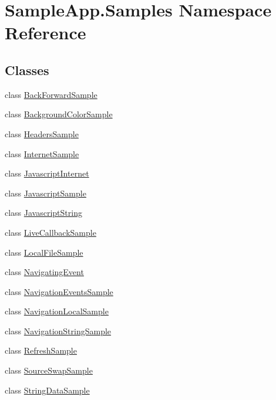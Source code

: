 \hypertarget{namespace_sample_app_1_1_samples}{}\section{Sample\+App.\+Samples Namespace Reference}
\label{namespace_sample_app_1_1_samples}
\subsection*{Classes}
\begin{DoxyCompactItemize}
\item 
class \hyperlink{class_sample_app_1_1_samples_1_1_back_forward_sample}{Back\+Forward\+Sample}
\item 
class \hyperlink{class_sample_app_1_1_samples_1_1_background_color_sample}{Background\+Color\+Sample}
\item 
class \hyperlink{class_sample_app_1_1_samples_1_1_headers_sample}{Headers\+Sample}
\item 
class \hyperlink{class_sample_app_1_1_samples_1_1_internet_sample}{Internet\+Sample}
\item 
class \hyperlink{class_sample_app_1_1_samples_1_1_javascript_internet}{Javascript\+Internet}
\item 
class \hyperlink{class_sample_app_1_1_samples_1_1_javascript_sample}{Javascript\+Sample}
\item 
class \hyperlink{class_sample_app_1_1_samples_1_1_javascript_string}{Javascript\+String}
\item 
class \hyperlink{class_sample_app_1_1_samples_1_1_live_callback_sample}{Live\+Callback\+Sample}
\item 
class \hyperlink{class_sample_app_1_1_samples_1_1_local_file_sample}{Local\+File\+Sample}
\item 
class \hyperlink{class_sample_app_1_1_samples_1_1_navigating_event}{Navigating\+Event}
\item 
class \hyperlink{class_sample_app_1_1_samples_1_1_navigation_events_sample}{Navigation\+Events\+Sample}
\item 
class \hyperlink{class_sample_app_1_1_samples_1_1_navigation_local_sample}{Navigation\+Local\+Sample}
\item 
class \hyperlink{class_sample_app_1_1_samples_1_1_navigation_string_sample}{Navigation\+String\+Sample}
\item 
class \hyperlink{class_sample_app_1_1_samples_1_1_refresh_sample}{Refresh\+Sample}
\item 
class \hyperlink{class_sample_app_1_1_samples_1_1_source_swap_sample}{Source\+Swap\+Sample}
\item 
class \hyperlink{class_sample_app_1_1_samples_1_1_string_data_sample}{String\+Data\+Sample}
\end{DoxyCompactItemize}
